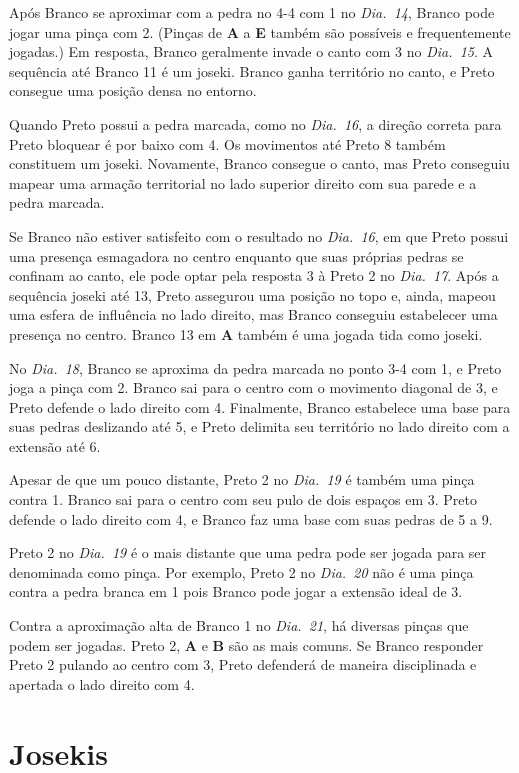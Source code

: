 Após Branco se aproximar com a pedra no 4-4 com 1 no \emph{Dia.\@~14}, Branco pode jogar uma pinça com 2. (Pinças de \textbf{A} a \textbf{E} também são possíveis e frequentemente jogadas.) Em resposta, Branco geralmente invade o canto com 3 no \emph{Dia.\@~15}. A sequência até Branco 11 é um joseki. Branco ganha território no canto, e Preto consegue uma posição densa no entorno.

Quando Preto possui a pedra marcada, como no \emph{Dia.\@~16}, a direção correta para Preto bloquear é por baixo com 4. Os movimentos até Preto 8 também constituem um joseki. Novamente, Branco consegue o canto, mas Preto conseguiu mapear uma armação territorial no lado superior direito com sua parede e a pedra marcada.

Se Branco não estiver satisfeito com o resultado no \emph{Dia.\@~16}, em que Preto possui uma presença esmagadora no centro enquanto que suas próprias pedras se confinam ao canto, ele pode optar pela resposta 3 à Preto 2 no \emph{Dia.\@~17}. Após a sequência joseki até 13, Preto assegurou uma posição no topo e, ainda, mapeou uma esfera de influência no lado direito, mas Branco conseguiu estabelecer uma presença no centro. Branco 13 em \textbf{A} também é uma jogada tida como joseki.

No \emph{Dia.\@~18}, Branco se aproxima da pedra marcada no ponto 3-4 com 1, e Preto joga a pinça com 2. Branco sai para o centro com o movimento diagonal de 3, e Preto defende o lado direito com 4. Finalmente, Branco estabelece uma base para suas pedras deslizando até 5, e Preto delimita seu território no lado direito com a extensão até 6.

Apesar de que um pouco distante, Preto 2 no \emph{Dia.\@~19} é também uma pinça contra 1. Branco sai para o centro com seu pulo de dois espaços em 3. Preto defende o lado direito com 4, e Branco faz uma base com suas pedras de 5 a 9.

Preto 2 no \emph{Dia.\@~19} é o mais distante que uma pedra pode ser jogada para ser denominada como pinça. Por exemplo, Preto 2 no \emph{Dia.\@~20} não é uma pinça contra a pedra branca em 1 pois Branco pode jogar a extensão ideal de 3.

Contra a aproximação alta de Branco 1 no \emph{Dia.\@~21}, há diversas pinças que podem ser jogadas. Preto 2, \textbf{A} e \textbf{B} são as mais comuns. Se Branco responder Preto 2 pulando ao centro com 3, Preto defenderá de maneira disciplinada e apertada o lado direito com 4.

\section{Josekis}

